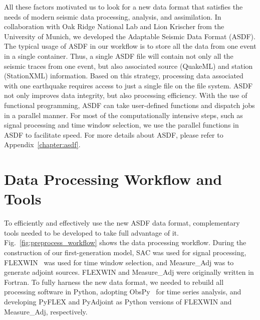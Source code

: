 All these factors motivated us to
look for a new data format that satisfies the needs of modern seismic data processing, analysis, and assimilation.
In collaboration with Oak Ridge National Lab and Lion Krischer from the University of Munich, we developed the Adaptable Seismic Data Format (ASDF).
The typical usage of ASDF in our workflow is to store all the data from one
event in a single container.
Thus, a single ASDF file will contain not only all the seismic traces from one
event, but also associated source (QuakeML) and station (StationXML) information.
Based on this strategy,
processing data associated with one earthquake requires access to just a single file on the file system.
ASDF not only improves data integrity, but also processing efficiency.
With the use of functional programming, ASDF can take user-defined functions and dispatch jobs in a parallel manner.
For most of the computationally intensive steps, such as signal
processing and time window selection, we use the parallel functions in ASDF
to facilitate speed.
For more details about ASDF, please refer to Appendix~\ref{chapter:asdf}.

\section{Data Processing Workflow and Tools}
\label{section:data_processing}

To efficiently and effectively use the new ASDF data format,
complementary tools needed to be developed to take full advantage of it.
Fig.~\ref{fig:preprocess_workflow} shows the data processing workflow.
During the construction of our first-generation model,
SAC was used for signal processing,
FLEXWIN~\cite{maggi2009automated} was used for time window selection,
and Measure\_Adj was to generate adjoint sources.
FLEXWIN and Measure\_Adj were originally written in Fortran.
To fully harness the new data format,
we needed to rebuild all processing software in Python,
adopting ObsPy~\cite{ObsPy2010} for time series analysis,
and developing PyFLEX and PyAdjoint as Python versions of FLEXWIN and Measure\_Adj,
respectively.


